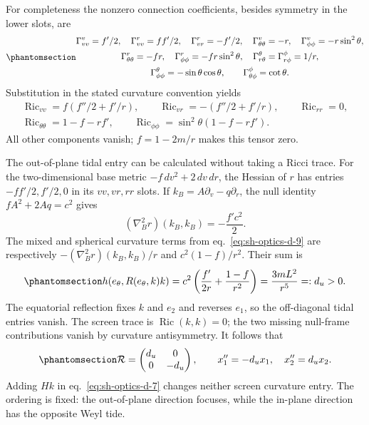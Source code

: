 \documentclass[
  english,
  11pt,
  reqno]{amsart}
\begin{document}
For completeness the nonzero connection coefficients, besides symmetry
in the lower slots, are
\begin{equation}\protect\phantomsection\label{eq:sh-optics-d-9}{
 \begin{gathered}
 \Gamma^v_{vv}=f'/2,\quad \Gamma^r_{vv}=ff'/2,
 \quad \Gamma^r_{vr}=-f'/2,\quad
 \Gamma^v_{\theta\theta}=-r,\quad
 \Gamma^v_{\phi\phi}=-r\sin^2\theta,\\
 \Gamma^r_{\theta\theta}=-fr,\quad
 \Gamma^r_{\phi\phi}=-fr\sin^2\theta,\quad
 \Gamma^\theta_{r\theta}=\Gamma^\phi_{r\phi}=1/r,\\
 \Gamma^\theta_{\phi\phi}=-\sin\theta\cos\theta,
 \qquad\Gamma^\phi_{\theta\phi}=\cot\theta.
 \end{gathered}
}\end{equation} Substitution in the stated curvature convention yields
\[
 \begin{gathered}
 \operatorname{Ric}_{vv}=f(f''/2+f'/r),\qquad
 \operatorname{Ric}_{vr}=-(f''/2+f'/r),\qquad
 \operatorname{Ric}_{rr}=0,\\
 \operatorname{Ric}_{\theta\theta}=1-f-rf',\qquad
 \operatorname{Ric}_{\phi\phi}=\sin^2\theta(1-f-rf').
 \end{gathered}
\] All other components vanish; \(f=1-2m/r\) makes this tensor zero.

The out-of-plane tidal entry can be calculated without taking a Ricci
trace. For the two-dimensional base metric \(-f\,dv^2+2\,dv\,dr\), the
Hessian of \(r\) has entries \(-ff'/2,f'/2,0\) in its \(vv,vr,rr\)
slots. If \(k_B=A\partial_v-q\partial_r\), the null identity
\(fA^2+2Aq=c^2\) gives \[
 (\nabla_B^2r)(k_B,k_B)=-\frac{f'c^2}{2}.
\] The mixed and spherical curvature terms from
eq.~\ref{eq:sh-optics-d-9} are respectively
\(-(\nabla_B^2r)(k_B,k_B)/r\) and \(c^2(1-f)/r^2\). Their sum is
\begin{equation}\protect\phantomsection\label{eq:sh-optics-d-10}{
 h(e_\theta,R(e_\theta,k)k)
 =c^2\left(\frac{f'}{2r}+\frac{1-f}{r^2}\right)
 =\frac{3mL^2}{r^5}=:d_u>0.
}\end{equation} The equatorial reflection fixes \(k\) and \(e_2\) and
reverses \(e_1\), so the off-diagonal tidal entries vanish. The screen
trace is \(\operatorname{Ric}(k,k)=0\); the two missing null-frame
contributions vanish by curvature antisymmetry. It follows that
\begin{equation}\protect\phantomsection\label{eq:sh-optics-d-11}{
 \mathcal R=\begin{pmatrix}d_u&0\\0&-d_u\end{pmatrix},
 \qquad x_1''=-d_u x_1,\quad x_2''=d_u x_2.
}\end{equation} Adding \(Hk\) in eq.~\ref{eq:sh-optics-d-7} changes
neither screen curvature entry. The ordering is fixed: the out-of-plane
direction focuses, while the in-plane direction has the opposite Weyl
tide.
\end{document}
